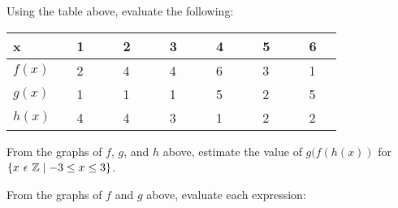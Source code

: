 \documentclass[11pt,addpoints]{exam}
\begin{document}
\begin{questions}
	\question Using the table above, evaluate the following: %
	\begin{table}[]
		\begin{tabular}{|l|l|l|l|l|l|l|}
			\hline
			x$\quad$$\quad$ & $\quad$1$\quad$ & $\quad$2$\quad$ & $\quad$3$\quad$ & $\quad$4$\quad$ & $\quad$5$\quad$ & $\quad$6$\quad$ \\ \hline
			$f(x)$          & $\quad$2$\quad$ & $\quad$4$\quad$ & $\quad$4$\quad$ & $\quad$6$\quad$ & $\quad$3$\quad$ & $\quad$1$\quad$ \\ \hline
			$g(x)$          & $\quad$1$\quad$ & $\quad$1$\quad$ & $\quad$1$\quad$ & $\quad$5$\quad$ & $\quad$2$\quad$ & $\quad$5$\quad$ \\ \hline
			$h(x)$          & $\quad$4$\quad$ & $\quad$4$\quad$ & $\quad$3$\quad$ & $\quad$1$\quad$ & $\quad$2$\quad$ & $\quad$2$\quad$ \\ \hline
		\end{tabular}
	\end{table}
	\begin{multicols}{2}
	\end{multicols}

	\question From the graphs of $f$, $g$, and $h$ above, estimate the value of $g(f(h(x))$ for $\{x\hspace{0.125cm}\epsilon\hspace{0.125cm}\mathbb{Z} \mid -3\leq x\leq 3\}$. %

	\question From the graphs of $f$ and $g$ above, evaluate each expression:
	\begin{multicols}{3}
		\begin{parts}

\end{parts}
\end{multicols}
\end{questions}
\end{document}
